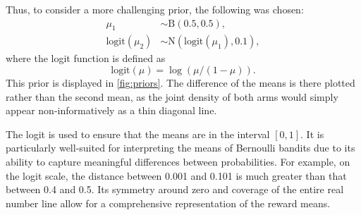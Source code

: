 Thus, to consider a more challenging prior, the following was chosen:
\begin{equation}
    \label{eq:challenging_prior}
    \begin{aligned}
        \mu_1               & \sim \text{B}(0.5, 0.5),                 \\
        \text{logit}(\mu_2) & \sim \text{N}(\text{logit}(\mu_1), 0.1),
    \end{aligned}
\end{equation}
where the logit function is defined as
\begin{equation}
    \label{eq:logit}
    \text{logit}(\mu) = \log(\mu/(1-\mu)).
\end{equation}
This prior is displayed in \cref{fig:priors}.
The difference of the means is there plotted rather than the second mean, as the joint density of both arms would simply appear non-informatively as a thin diagonal line.

The logit is used to ensure that the means are in the interval $[0, 1]$.
It is particularly well-suited for interpreting the means of Bernoulli bandits due to its ability to capture meaningful differences between probabilities. For example, on the logit scale, the distance between 0.001 and 0.101 is much greater than that between 0.4 and 0.5.
Its symmetry around zero and coverage of the entire real number line allow for a comprehensive representation of the reward means.

